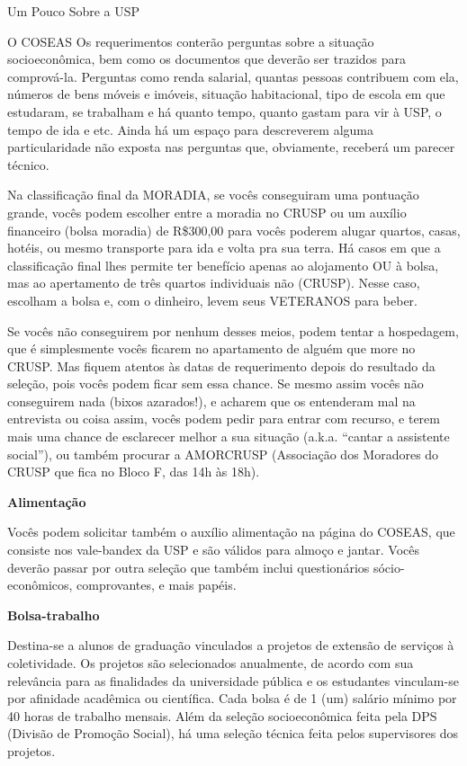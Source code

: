 \begin{secao}{Um Pouco Sobre a USP}
\begin{subsecao}{O COSEAS}
Os requerimentos conterão perguntas sobre a situação socioeconômica, bem como os
documentos que deverão ser trazidos para comprová-la. Perguntas como renda
salarial, quantas pessoas contribuem com ela, números de bens móveis e imóveis,
situação habitacional, tipo de escola em que estudaram, se trabalham e há quanto
tempo, quanto gastam para vir à USP, o tempo de ida e etc. Ainda há um espaço
para descreverem alguma particularidade não exposta nas perguntas que, obviamente,
receberá um parecer técnico.

Na classificação final da MORADIA, se vocês conseguiram uma pontuação grande, vocês
podem escolher entre a moradia no CRUSP ou um auxílio financeiro (bolsa moradia)
de R\$300,00 para vocês poderem alugar quartos, casas, hotéis, ou mesmo transporte
para ida e volta pra sua terra. Há casos em que a classificação final lhes
permite ter benefício apenas ao alojamento OU à bolsa, mas ao apertamento de
três quartos individuais não (CRUSP). Nesse caso, escolham a bolsa e, com o
dinheiro, levem seus VETERANOS para beber.

Se vocês não conseguirem por nenhum desses meios, podem tentar a hospedagem, que é
simplesmente vocês ficarem no apartamento de alguém que more no CRUSP. Mas fiquem
atentos às datas de requerimento depois do resultado da seleção, pois vocês podem
ficar sem essa chance. Se mesmo assim vocês não conseguirem nada (bixos azarados!),
e acharem que os entenderam mal na entrevista ou coisa assim, vocês podem pedir para
entrar com recurso, e terem mais uma chance de esclarecer melhor a sua situação
(a.k.a. “cantar a assistente social”), ou também procurar a
AMORCRUSP (Associação dos Moradores do CRUSP que fica no Bloco F, das 14h às 18h).

{\bf Alimentação}

Vocês podem solicitar também o auxílio alimentação na página do COSEAS, que
consiste nos vale-bandex da USP e são válidos para almoço e jantar. Vocês deverão
passar por outra seleção que também inclui questionários sócio-econômicos,
comprovantes, e mais papéis.

{\bf Bolsa-trabalho}

Destina-se a alunos de graduação vinculados a projetos de extensão de serviços à
coletividade. Os projetos são selecionados anualmente, de acordo com sua relevância
para as finalidades da universidade pública e os estudantes vinculam-se por
afinidade acadêmica ou científica. Cada bolsa é de 1 (um) salário mínimo por
40 horas de trabalho mensais. Além da seleção socioeconômica feita pela
DPS (Divisão de Promoção Social), há uma seleção técnica feita pelos supervisores
dos projetos.


\end{subsecao}
\end{secao}
